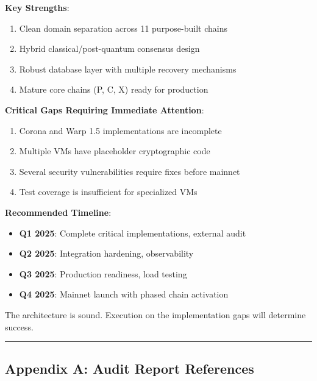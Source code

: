 \documentclass[
]{article}
\providecommand{\tightlist}{%
  \setlength{\itemsep}{0pt}\setlength{\parskip}{0pt}}
\begin{document}
\textbf{Key Strengths}:

\begin{enumerate}
\def\labelenumi{\arabic{enumi}.}
\tightlist
\item
  Clean domain separation across 11 purpose-built chains
\item
  Hybrid classical/post-quantum consensus design
\item
  Robust database layer with multiple recovery mechanisms
\item
  Mature core chains (P, C, X) ready for production
\end{enumerate}

\textbf{Critical Gaps Requiring Immediate Attention}:

\begin{enumerate}
\def\labelenumi{\arabic{enumi}.}
\tightlist
\item
  Corona and Warp 1.5 implementations are incomplete
\item
  Multiple VMs have placeholder cryptographic code
\item
  Several security vulnerabilities require fixes before mainnet
\item
  Test coverage is insufficient for specialized VMs
\end{enumerate}

\textbf{Recommended Timeline}:

\begin{itemize}
\tightlist
\item
  \textbf{Q1 2025}: Complete critical implementations, external audit
\item
  \textbf{Q2 2025}: Integration hardening, observability
\item
  \textbf{Q3 2025}: Production readiness, load testing
\item
  \textbf{Q4 2025}: Mainnet launch with phased chain activation
\end{itemize}

The architecture is sound. Execution on the implementation gaps will
determine success.

\begin{center}\rule{0.5\linewidth}{0.5pt}\end{center}

\subsection{Appendix A: Audit Report
References}\label{appendix-a-audit-report-references}
\end{document}
